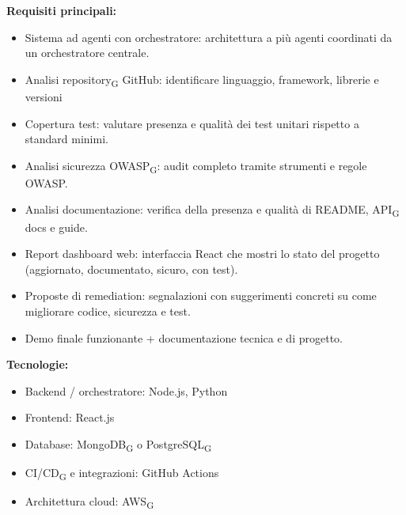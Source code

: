 \vspace{0.3cm}
\textbf{Requisiti principali:}
\begin{itemize}
	\item {Sistema ad agenti con orchestratore: architettura a più agenti coordinati da un orchestratore centrale.}
	\item {Analisi repository\textsubscript{G} GitHub: identificare linguaggio, framework, librerie e versioni}
    \item {Copertura test: valutare presenza e qualità dei test unitari rispetto a standard minimi.}
    \item {Analisi sicurezza OWASP\textsubscript{G}: audit completo tramite strumenti e regole OWASP.}
    \item {Analisi documentazione: verifica della presenza e qualità di README, API\textsubscript{G} docs e guide.}
    \item {Report dashboard web: interfaccia React che mostri lo stato del progetto (aggiornato, documentato, sicuro, con test).}
    \item {Proposte di remediation: segnalazioni con suggerimenti concreti su come migliorare codice, sicurezza e test.}
    \item {Demo finale funzionante + documentazione tecnica e di progetto.}
\end{itemize}

\vspace{0.3cm}
\textbf{Tecnologie:}
\begin{itemize}
	\item {Backend / orchestratore: Node.js, Python}
    \item {Frontend: React.js}
    \item {Database: MongoDB\textsubscript{G} o PostgreSQL\textsubscript{G}}
    \item {CI/CD\textsubscript{G} e integrazioni: GitHub Actions}
    \item {Architettura cloud: AWS\textsubscript{G}}
\end{itemize}

